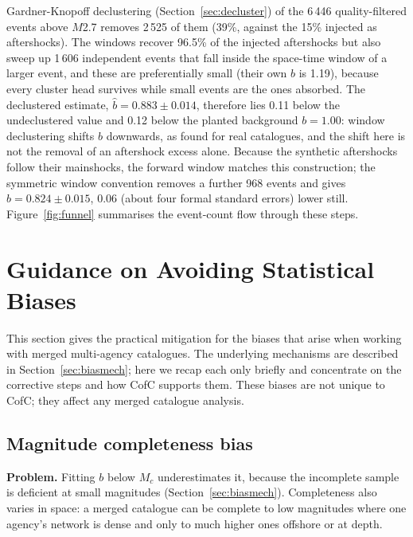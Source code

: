 \documentclass[12pt]{article}
\begin{document}
Gardner-Knopoff declustering (Section~\ref{sec:decluster}) of the 6\,446
quality-filtered events above $M$2.7 removes 2\,525 of them (39\%, against the
15\% injected as aftershocks).  The windows recover 96.5\% of the injected
aftershocks but also sweep up 1\,606 independent events that fall inside the
space-time window of a larger event, and these are preferentially small (their
own $\hat{b}$ is 1.19), because every cluster head survives while small events
are the ones absorbed.  The declustered estimate, $\hat{b} = 0.883 \pm 0.014$,
therefore lies 0.11 below the undeclustered value and 0.12 below the planted
background $b = 1.00$: window declustering shifts $b$ downwards, as \citet{mizrahi2021}
found for real catalogues, and the shift here is not the removal of an
aftershock excess alone.  Because the synthetic aftershocks follow their
mainshocks, the forward window matches this construction; the symmetric window
convention removes a further 968 events and gives $\hat{b} = 0.824 \pm 0.015$,
0.06 (about four formal standard errors) lower still.  Figure~\ref{fig:funnel}
summarises the event-count flow through these steps.

\section{Guidance on Avoiding Statistical Biases}
\label{sec:biases}

This section gives the practical mitigation for the biases that arise when
working with merged multi-agency catalogues.  The underlying mechanisms are
described in Section~\ref{sec:biasmech}; here we recap each only briefly and
concentrate on the corrective steps and how CofC supports them.  These biases
are not unique to CofC; they affect any merged catalogue analysis.

\subsection{Magnitude completeness bias}

\textbf{Problem.} Fitting $b$ below $M_c$ underestimates it, because the
incomplete sample is deficient at small magnitudes (Section~\ref{sec:biasmech}).
Completeness also varies in space: a merged catalogue can be complete to low
magnitudes where one agency's network is dense and only to much higher ones
offshore or at depth.
\end{document}
